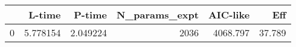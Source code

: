 \begin{tabular}{lrrrrr}
\toprule
{} &    L-time &    P-time &  N\_params\_expt &  AIC-like &     Eff \\
\midrule
0 &  5.778154 &  2.049224 &           2036 &  4068.797 &  37.789 \\
\bottomrule
\end{tabular}
